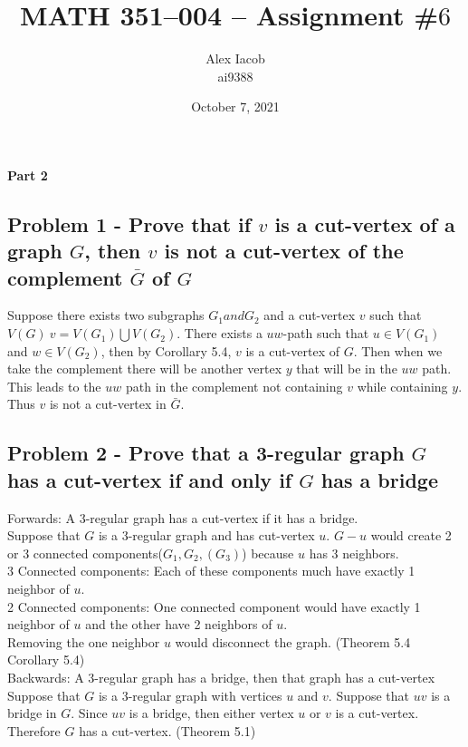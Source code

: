\documentclass[10pt,a4paper]{article}
\title{MATH 351--004 -- Assignment \#$6$\\
}
\author{Alex Iacob\\
ai9388}
\date{October 7, 2021}
\begin{document}
\maketitle

\begin{center}
{\bf \large Part 2}
\end{center}

\subsection*{Problem 1 - Prove that if $v$ is a cut-vertex of a graph $G$,  then $v$ is not a cut-vertex of the complement $\bar{G}$ of $G$}
Suppose there exists two subgraphs $G_{1}  and  G_{2}$ and a cut-vertex $v$ such that $V(G) \ {v} = V(G_{1}) \bigcup V(G_{2})$. There exists a $uw$-path such that $u \in V(G_{1})$ and $w \in V(G_{2})$, then by Corollary 5.4, $v$ is a cut-vertex of $G$. Then when we take the complement there will be another vertex $y$ that will be in the $uw$ path. This leads to the $uw$ path in the complement not containing $v$ while containing $y$. Thus $v$ is not a cut-vertex in $\bar{G}$.

\subsection*{Problem 2 - Prove that a 3-regular graph $G$ has a cut-vertex if and only if $G$ has a bridge}
Forwards: A 3-regular graph has a cut-vertex if it has a bridge.\\
Suppose that $G$ is a 3-regular graph and has cut-vertex $u$. $G - u$ would create 2 or 3 connected components($G_{1}, G_{2}, (G_{3}) $) because $u$ has 3 neighbors.\\ 
3 Connected components: Each of these components much have exactly 1 neighbor of $u$.\\ 
2 Connected components: One connected component would have exactly 1 neighbor of $u$ and the other have 2 neighbors of $u$.\\
Removing the one neighbor $u$ would disconnect the graph. (Theorem 5.4 Corollary 5.4)\\
Backwards: A 3-regular graph has a bridge, then that graph has a cut-vertex\\
Suppose that $G$ is a 3-regular graph with vertices $u$ and $v$. Suppose that $uv$ is a bridge in $G$. Since $uv$ is a bridge, then either vertex $u$ or $v$ is a cut-vertex. Therefore $G$ has a cut-vertex. (Theorem 5.1)
\end{document}
